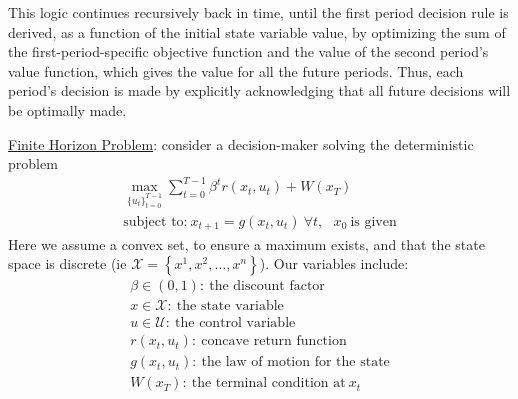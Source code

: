 \documentclass{article}
\begin{document}
This logic continues recursively back in time, until the first period decision rule is derived, as a function of the initial state variable value, by optimizing the sum of the first-period-specific objective function and the value of the second period's value function, which gives the value for all the future periods. Thus, each period's decision is made by explicitly acknowledging that all future decisions will be optimally made.
\vspace{2.5mm}
\par \underline{Finite Horizon Problem}: consider a decision-maker solving the deterministic problem
\begin{gather*}
    \max_{\{ u_{t} \} _{t=0}^{T−1}} \sum_{t=0}^{T-1} \beta^{t}r(x_{t},u_{t}) + W(x_{T}) \\ \text{subject to:} \ x_{t+1} = g(x_{t}, u_{t}) \ \forall t, \ \ \ x_{0} \ \text{is given}
\end{gather*}
Here we assume a convex set, to ensure a maximum exists, and that the state space is discrete (ie $\mathcal{X} = \left\{x^{1}, x^{2}, \dots, x^{n}\right\}$). Our variables include:
\begin{gather*}
\beta \in (0,1): \ \text{the discount factor} \\
x \in \mathcal{X}:\ \text{the state variable} \\
u \in \mathcal{U}:\ \text{the control variable} \\
r(x_{t},u_{t}): \ \text{concave return function} \\
g(x_{t}, u_{t}): \ \text{the law of motion for the state} \\
W(x_{T}): \ \text{the terminal condition at} \ x_{t}
\end{gather*}
\end{document}
